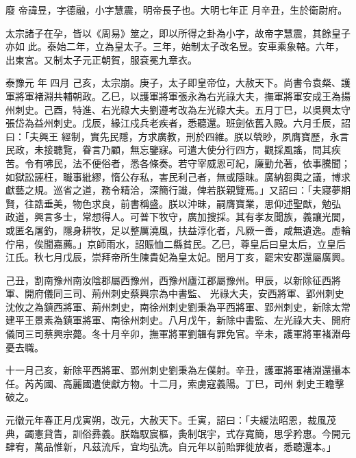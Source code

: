 
\begin{pinyinscope}

 廢
 帝諱昱，字德融，小字慧震，明帝長子也。大明七年正
 月辛丑，生於衛尉府。



 太宗諸子在孕，皆以《周易》筮之，即以所得之卦為小字，故帝字慧震，其餘皇子亦如
 此。泰始二年，立為皇太子。三年，始制太子改名昱。安車乘象輅。六年，出東宮。又制太子元正朝賀，服袞冕九章衣。



 泰豫元
 年
 四月
 己亥，太宗崩。庚子，太子即皇帝位，大赦天下。尚書令袁粲、護軍將軍褚淵共輔朝政。乙巳，以護軍將軍張永為右光祿大夫，撫軍將軍安成王為揚州刺史。己酉，特進、右光祿大夫劉遵考改為左光祿大夫。五月丁巳，以吳興太守張岱為益州刺史。戊辰，緣江戍兵老疾者，悉聽還。班劍依舊入殿。六月壬辰，詔曰：「夫興王
 經制，實先民隱，方求廣教，刑於四維。朕以煢眇，夙膺寶歷，永言民政，未接聽覽，眷言乃顧，無忘鑒寐。可遣大使分行四方，觀採風謠，問其疾苦。令有咈民，法不便俗者，悉各條奏。若守宰威恩可紀，廉勤允著，依事騰聞；如獄訟誣枉，職事紕繆，惰公存私，害民利己者，無或隱昧。廣納芻輿之議，博求獻藝之規。巡省之道，務令精洽，深簡行識，俾若朕親覽焉。」又詔曰：「夫寢夢期賢，往誥垂美，物色求良，前書稱盛。朕以沖昧，嗣膺寶業，思仰述聖猷，勉弘
 政道，興言多士，常想得人。可普下牧守，廣加搜採。其有孝友聞族，義讓光閭，或匿名屠釣，隱身耕牧，足以整厲澆風，扶益淳化者，凡厥一善，咸無遺逸。虛輪佇帛，俟聞嘉薦。」京師雨水，詔賑恤二縣貧民。乙巳，尊皇后曰皇太后，立皇后江氏。秋七月戊辰，崇拜帝所生陳貴妃為皇太妃。閏月丁亥，罷宋安郡還屬廣興。



 己丑，割南豫州南汝陰郡屬西豫州，西豫州廬江郡屬豫州。甲辰，以新除征西將軍、開府儀同三司、荊州刺史蔡興宗為中書監、
 光祿大夫，安西將軍、郢州刺史沈攸之為鎮西將軍、荊州刺史，南徐州刺史劉秉為平西將軍、郢州刺史，新除太常建平王景素為鎮軍將軍、南徐州刺史。八月戊午，新除中書監、左光祿大夫、開府儀同三司蔡興宗薨。冬十月辛卯，撫軍將軍劉韞有罪免官。辛未，護軍將軍褚淵母憂去職。



 十一月己亥，新除平西將軍、郢州刺史劉秉為左僕射。辛丑，護軍將軍褚淵還攝本任。芮芮國、高麗國遣使獻方物。十二月，索虜寇義陽。丁巳，司州
 刺史王瞻擊破之。



 元徽元年春正月戊寅朔，改元，大赦天下。壬寅，詔曰：「夫緩法昭恩，裁風茂典，蠲憲貸眚，訓俗彞義。朕臨馭宸樞，夤制氓宇，式存寬簡，思孚矜惠。今開元肆宥，萬品惟新，凡茲流斥，宜均弘洗。自元年以前貽罪徙放者，悉聽還本。」




\end{pinyinscope}
